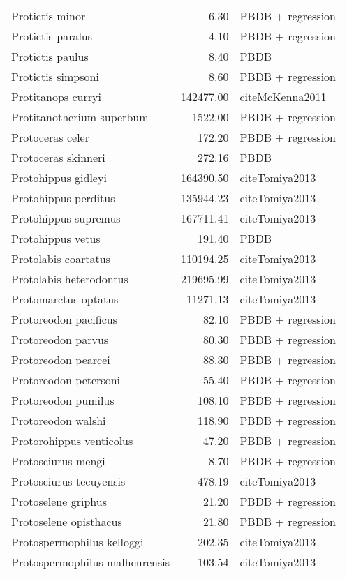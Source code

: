 \begin{table}[ht]
\begin{tabular}{lrl}
  Protictis minor & 6.30 & PBDB + regression \\ 
  Protictis paralus & 4.10 & PBDB + regression \\ 
  Protictis paulus & 8.40 & PBDB \\ 
  Protictis simpsoni & 8.60 & PBDB + regression \\ 
  Protitanops curryi & 142477.00 & cite{McKenna2011} \\ 
  Protitanotherium superbum & 1522.00 & PBDB + regression \\ 
  Protoceras celer & 172.20 & PBDB + regression \\ 
  Protoceras skinneri & 272.16 & PBDB \\ 
  Protohippus gidleyi & 164390.50 & cite{Tomiya2013} \\ 
  Protohippus perditus & 135944.23 & cite{Tomiya2013} \\ 
  Protohippus supremus & 167711.41 & cite{Tomiya2013} \\ 
  Protohippus vetus & 191.40 & PBDB \\ 
  Protolabis coartatus & 110194.25 & cite{Tomiya2013} \\ 
  Protolabis heterodontus & 219695.99 & cite{Tomiya2013} \\ 
  Protomarctus optatus & 11271.13 & cite{Tomiya2013} \\ 
  Protoreodon pacificus & 82.10 & PBDB + regression \\ 
  Protoreodon parvus & 80.30 & PBDB + regression \\ 
  Protoreodon pearcei & 88.30 & PBDB + regression \\ 
  Protoreodon petersoni & 55.40 & PBDB + regression \\ 
  Protoreodon pumilus & 108.10 & PBDB + regression \\ 
  Protoreodon walshi & 118.90 & PBDB + regression \\ 
  Protorohippus venticolus & 47.20 & PBDB + regression \\ 
  Protosciurus mengi & 8.70 & PBDB + regression \\ 
  Protosciurus tecuyensis & 478.19 & cite{Tomiya2013} \\ 
  Protoselene griphus & 21.20 & PBDB + regression \\ 
  Protoselene opisthacus & 21.80 & PBDB + regression \\ 
  Protospermophilus kelloggi & 202.35 & cite{Tomiya2013} \\ 
  Protospermophilus malheurensis & 103.54 & cite{Tomiya2013} \\ 

\end{tabular}
\end{table}
